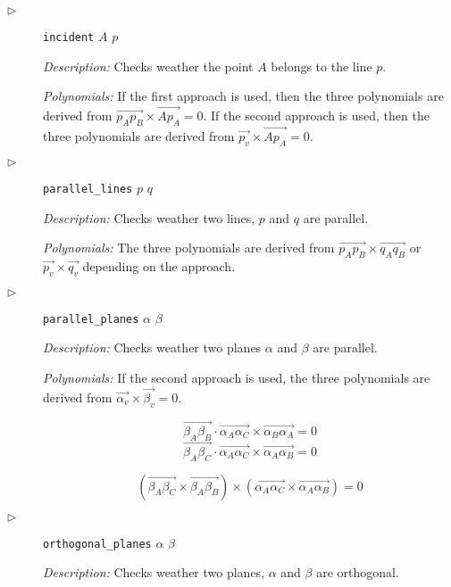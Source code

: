 \documentclass{aicom2e}
\begin{document}
\begin{description}
\item[$\triangleright$] {\tt incident} $A$ $p$

{\em Description:} Checks weather the point $A$ belongs to the line
$p$.

{\em Polynomials:} If the first approach is used, then the three
polynomials are derived from
$\overrightarrow{p_Ap_B} \times \overrightarrow{Ap_A} = 0$. If the
second approach is used, then the three polynomials are derived from
$\overrightarrow{p_v} \times \overrightarrow{Ap_A} = 0.$

\item[$\triangleright$] {\tt parallel\_lines} $p$ $q$

{\em Description:} Checks weather two lines, $p$ and $q$ are parallel.

{\em Polynomials:} The three polynomials are derived from
$\overrightarrow{p_Ap_B} \times \overrightarrow{q_Aq_B}$ or
$\overrightarrow{p_v} \times \overrightarrow{q_v}$ depending on the
approach.

\item[$\triangleright$] {\tt parallel\_planes} $\alpha$ $\beta$

{\em Description:} Checks weather two planes $\alpha$ and $\beta$ are
parallel.

{\em Polynomials:} If the second approach is used, the three
polynomials are derived from
$\overrightarrow{\alpha_v} \times \overrightarrow{\beta_v} = 0.$



$$\overrightarrow{\beta_A\beta_B}\cdot \overrightarrow{\alpha_A\alpha_C} \times \overrightarrow{\alpha_B\alpha_A} = 0$$
$$\overrightarrow{\beta_A\beta_C}\cdot \overrightarrow{\alpha_A\alpha_C} \times \overrightarrow{\alpha_A\alpha_B} = 0$$

$$(\overrightarrow{\beta_A\beta_C}\times\overrightarrow{\beta_A\beta_B}) \times (\overrightarrow{\alpha_A\alpha_C} \times \overrightarrow{\alpha_A\alpha_B}) = 0$$


\item[$\triangleright$] {\tt orthogonal\_planes} $\alpha$ $\beta$

{\em Description:} Checks weather two planes, $\alpha$ and $\beta$ are
orthogonal.


\end{description}
\end{document}
